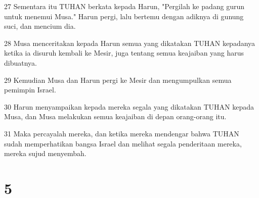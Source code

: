 \par 27 Sementara itu TUHAN berkata kepada Harun, "Pergilah ke padang gurun untuk menemui Musa." Harun pergi, lalu bertemu dengan adiknya di gunung suci, dan mencium dia.
\par 28 Musa menceritakan kepada Harun semua yang dikatakan TUHAN kepadanya ketika ia disuruh kembali ke Mesir, juga tentang semua keajaiban yang harus dibuatnya.
\par 29 Kemudian Musa dan Harun pergi ke Mesir dan mengumpulkan semua pemimpin Israel.
\par 30 Harun menyampaikan kepada mereka segala yang dikatakan TUHAN kepada Musa, dan Musa melakukan semua keajaiban di depan orang-orang itu.
\par 31 Maka percayalah mereka, dan ketika mereka mendengar bahwa TUHAN sudah memperhatikan bangsa Israel dan melihat segala penderitaan mereka, mereka sujud menyembah.

\chapter{5}

